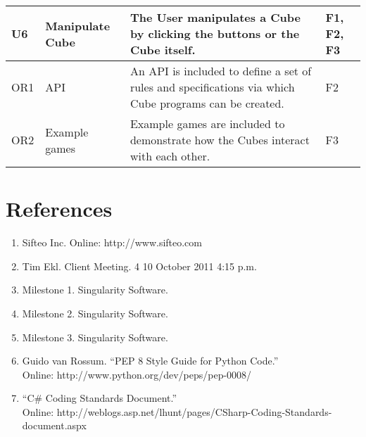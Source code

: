 \documentclass[12pt]{article}
\begin{document}
\begin{landscape}
\begin{table}[h!]
\begin{tabular}{p{.4in} | p{1.75in} | p{6in} | p{.75in}}
        U6 &
        Manipulate Cube &
        The User manipulates a Cube by clicking the buttons or the Cube itself. &
        F1, F2, F3 \\ \hline

        OR1 &
        API &
        An API is included to define a set of rules and specifications via which Cube programs can be created. &
        F2 \\ \hline

        OR2 &
        Example games &
        Example games are included to demonstrate how the Cubes interact with each other. &
        F3 \\ \hline

        \end{tabular}
    \end{table}
    
    
    \end{landscape}

\clearpage
{}
\printglossaries
\clearpage

\section*{References}

        \begin{enumerate}
                \item{Sifteo Inc. Online: http://www.sifteo.com}
                \item{Tim Ekl.  Client Meeting. 4 10 October 2011 4:15 p.m.}
                \item{Milestone 1.  Singularity Software.}
                \item{Milestone 2.  Singularity Software.}
                \item{Milestone 3.  Singularity Software.}
                \item{Guido van Rossum.  ``PEP 8 Style Guide for Python Code.'' \\Online: http://www.python.org/dev/peps/pep-0008/}
                \item{``C\# Coding Standards Document.'' \\Online: http://weblogs.asp.net/lhunt/pages/CSharp-Coding-Standards-document.aspx}

        \end{enumerate}

\clearpage

\printindex
\end{document}

